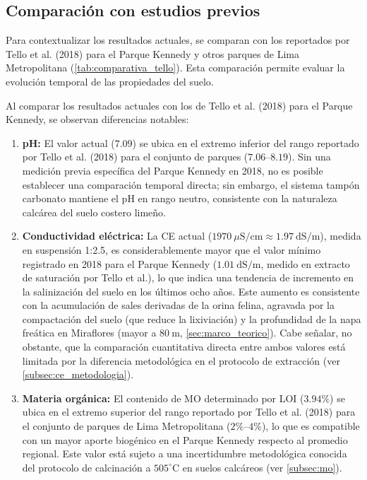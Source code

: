 \documentclass[fleqn]{jaes}
\begin{document}
\subsection{Comparación con estudios previos}\label{subsec:comparacion_tello}

Para contextualizar los resultados actuales, se comparan con los reportados por Tello et al. (2018) para el Parque Kennedy y otros parques de Lima Metropolitana (\cref{tab:comparativa_tello}). Esta comparación permite evaluar la evolución temporal de las propiedades del suelo.

Al comparar los resultados actuales con los de Tello et al. (2018) para el Parque Kennedy, se observan diferencias notables:

\begin{enumerate}
  \item \textbf{pH:} El valor actual ($7.09$) se ubica en el extremo inferior del rango reportado por Tello et al. (2018) para el conjunto de parques ($7.06$--$8.19$). Sin una medición previa específica del Parque Kennedy en 2018, no es posible establecer una comparación temporal directa; sin embargo, el sistema tampón carbonato mantiene el pH en rango neutro, consistente con la naturaleza calcárea del suelo costero limeño.
  
  \item \textbf{Conductividad eléctrica:} La CE actual ($1970~\mu\text{S/cm} \approx 1.97~\text{dS/m}$), medida en suspensión 1:2.5, es considerablemente mayor que el valor mínimo registrado en 2018 para el Parque Kennedy ($1.01~\text{dS/m}$, medido en extracto de saturación por Tello et al.), lo que indica una tendencia de incremento en la salinización del suelo en los últimos ocho años. Este aumento es consistente con la acumulación de sales derivadas de la orina felina, agravada por la compactación del suelo (que reduce la lixiviación) y la profundidad de la napa freática en Miraflores (mayor a $80~\text{m}$, \cref{sec:marco_teorico}). Cabe señalar, no obstante, que la comparación cuantitativa directa entre ambos valores está limitada por la diferencia metodológica en el protocolo de extracción (ver \cref{subsec:ce_metodologia}).

  \item \textbf{Materia orgánica:} El contenido de MO determinado por LOI ($3.94\%$) se ubica en el extremo superior del rango reportado por Tello et al. (2018) para el conjunto de parques de Lima Metropolitana ($2\%$--$4\%$), lo que es compatible con un mayor aporte biogénico en el Parque Kennedy respecto al promedio regional. Este valor está sujeto a una incertidumbre metodológica conocida del protocolo de calcinación a $505^\circ\text{C}$ en suelos calcáreos (ver \cref{subsec:mo}).


\end{enumerate}
\end{document}
